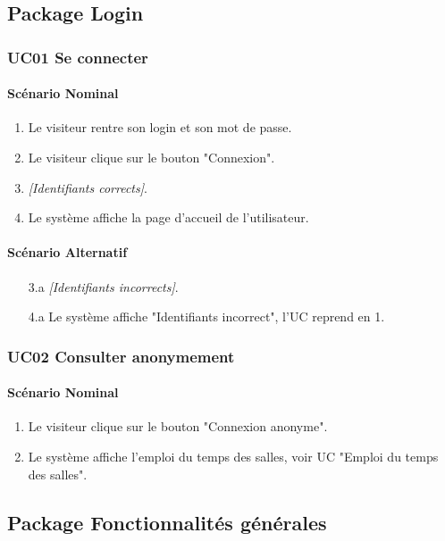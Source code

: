 \documentclass[a4paper,12pt]{article}
\begin{document}
\subsection{Package Login}
\subsubsection{UC01 Se connecter}
\paragraph{Scénario Nominal}
\begin{enumerate}
    \item Le visiteur rentre son login et son mot de passe.
    \item Le visiteur clique sur le bouton "Connexion".
    \item \textit{[Identifiants corrects]}.
    \item Le système affiche la page d'accueil de l'utilisateur.
\end{enumerate}

\paragraph{Scénario Alternatif}
\begin{enumerate}
    \item[3.a] \textit{[Identifiants incorrects]}.
    \item[4.a] Le système affiche "Identifiants incorrect", l'UC reprend en 1.
\end{enumerate}

\subsubsection{UC02 Consulter anonymement}
\paragraph{Scénario Nominal}
\begin{enumerate}
    \item Le visiteur clique sur le bouton "Connexion anonyme".
    \item Le système affiche l'emploi du temps des salles, voir UC "Emploi du temps des salles".
\end{enumerate}

\subsection{Package Fonctionnalités générales}
\end{document}
